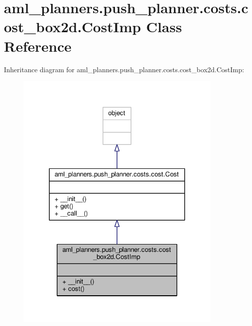 \hypertarget{classaml__planners_1_1push__planner_1_1costs_1_1cost__box2d_1_1_cost_imp}{\section{aml\-\_\-planners.\-push\-\_\-planner.\-costs.\-cost\-\_\-box2d.\-Cost\-Imp Class Reference}
\label{classaml__planners_1_1push__planner_1_1costs_1_1cost__box2d_1_1_cost_imp}
}


Inheritance diagram for aml\-\_\-planners.\-push\-\_\-planner.\-costs.\-cost\-\_\-box2d.\-Cost\-Imp\-:
\nopagebreak
\begin{figure}[H]
\begin{center}
\leavevmode
\includegraphics[width=288pt]{classaml__planners_1_1push__planner_1_1costs_1_1cost__box2d_1_1_cost_imp__inherit__graph}
\end{center}
\end{figure}


